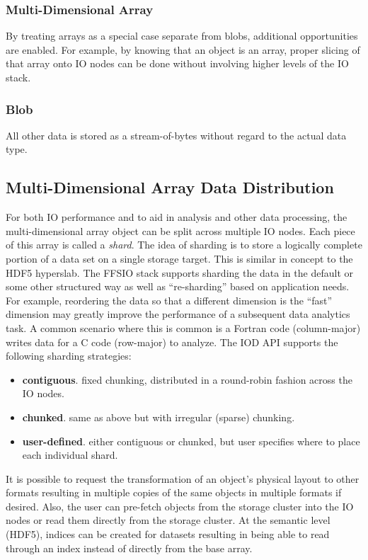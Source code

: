 \documentclass[conference]{IEEEtran} \pdfpagewidth=8.5in
\begin{document}
\subsubsection{Multi-Dimensional Array}
By treating arrays as a special case separate from blobs, additional
opportunities are enabled. For example, by knowing that an object is an array,
proper slicing of that array onto IO nodes can be done without involving higher
levels of the IO stack.

\subsubsection{Blob}
All other data is stored as a stream-of-bytes without regard to the actual
data type.

\subsection{Multi-Dimensional Array Data Distribution}

For both IO performance and to aid in analysis and other data processing, the
multi-dimensional array object can be split across multiple IO nodes. Each
piece of this array is called a {\em shard}.  The idea of sharding is to store
a logically complete portion of a data set on a single storage target. This is
similar in concept to the HDF5 hyperslab.  The FFSIO stack supports sharding
the data in the default or some other structured way as well as ``re-sharding''
based on application needs. For example, reordering the data so that a
different dimension is the ``fast'' dimension may greatly improve the
performance of a subsequent data analytics task. A common scenario where this
is common is a Fortran code (column-major) writes data for a C code (row-major)
to analyze.  The IOD API supports the following sharding strategies:

\begin{itemize}
\item
  \textbf{contiguous}. fixed chunking, distributed in a round-robin
  fashion across the IO nodes.
\item
  \textbf{chunked}. same as above but with irregular (sparse) chunking.
\item
  \textbf{user-defined}. either contiguous or chunked, but user specifies
  where to place each individual shard.
\end{itemize}

It is possible to request the transformation of an object's physical
layout to other formats resulting in multiple copies of the same objects in
multiple formats if desired. Also, the user can pre-fetch objects from
the storage cluster into the IO nodes or read them directly from the
storage cluster. At the semantic level (HDF5), indices can be created
for datasets resulting in being able to read through an index instead of
directly from the base array.
\end{document}
